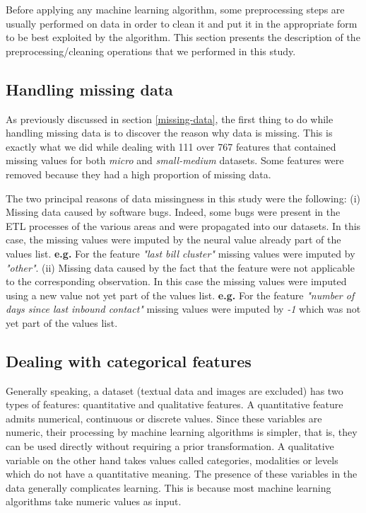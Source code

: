 \documentclass[LaM,binding=0.6cm, english]{sapthesis}
\begin{document}
Before applying any machine learning algorithm, some preprocessing steps are usually performed on data in order to clean it and put it in the appropriate form to be best exploited by the algorithm. This section presents the description of the preprocessing/cleaning operations that we performed in this study.

\subsection{Handling missing data}

As previously discussed in section \ref{missing-data}, the first thing to do while handling missing data is to discover the reason why data is missing. This is exactly what we did while dealing with 111 over 767 features that contained missing values for both \textit{micro} and \textit{small-medium} datasets. Some features were removed because they had a high proportion of missing data.

The two principal reasons of data missingness in this study were the following: (i) Missing data caused by software bugs. Indeed, some bugs were present in the ETL processes of the various areas and were propagated into our datasets. In this case, the missing values were imputed by the neural value already part of the values list. \textbf{e.g.} For the feature \textit{"last bill cluster"} missing values were imputed by \textit{"other"}. (ii) Missing data caused by the fact that the feature were not applicable to the corresponding observation. In this case the missing values were imputed using a new value not yet part of the values list. \textbf{e.g.} For the feature \textit{"number of days since last inbound contact"} missing values were imputed by \textit{-1} which was not yet part of the values list.

\subsection{Dealing with categorical features}

Generally speaking, a dataset (textual data and images are excluded) has two types of features: quantitative and qualitative features. A quantitative feature admits numerical, continuous or discrete values. Since these variables are numeric, their processing by machine learning algorithms is simpler, that is, they can be used directly without requiring a prior transformation. A qualitative variable on the other hand takes values called categories, modalities or levels which do not have a quantitative meaning. The presence of these variables in the data generally complicates learning. This is because most machine learning algorithms take numeric values as input.
\end{document}

